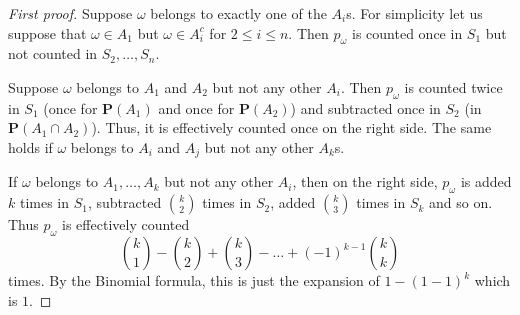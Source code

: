 \documentclass[preprint,  11pt]{amsart}
\theoremstyle{plain} %
\theoremstyle{definition} %
\begin{document}
{{{{{{{{{{{{{\begin{proof}[First proof]
Suppose $\omega$ belongs to exactly one of the $A_{i}$s. For simplicity let us suppose that $\omega\in A_{1}$ but $\omega\in A_{i}^{c}$ for $2\le i\le n$. Then $p_{\omega}$ is counted once in $S_{1}$ but not counted in $S_{2},\ldots ,S_{n}$.

Suppose $\omega$ belongs to $A_{1}$ and $A_{2}$ but not any other $A_{i}$. Then $p_{\omega}$ is counted twice in $S_{1}$ (once for $\mathbf{P}(A_{1})$ and once for $\mathbf{P}(A_{2})$) and subtracted once in $S_{2}$ (in $\mathbf{P}(A_{1}\cap A_{2})$). Thus, it is effectively counted once on the right side. The same holds if $\omega$ belongs to $A_{i}$ and $A_{j}$ but not any other $A_{k}$s.

If $\omega$ belongs to $A_{1},\ldots ,A_{k}$ but not any other $A_{i}$, then  on the right side, $p_{\omega}$ is added $k$ times in $S_{1}$, subtracted $\binom{k}{2}$ times in $S_{2}$, added $\binom{k}{3}$ times in $S_{k}$ and so on. Thus $p_{\omega}$ is effectively counted
$$
\binom{k}{1}-\binom{k}{2}+\binom{k}{3}-\ldots +(-1)^{k-1}\binom{k}{k}
$$
times. By the Binomial formula, this is just the expansion of  $1-(1-1)^{k}$ which is $1$.
\end{proof}

}}}}}}}}}}}}}
\end{document}

